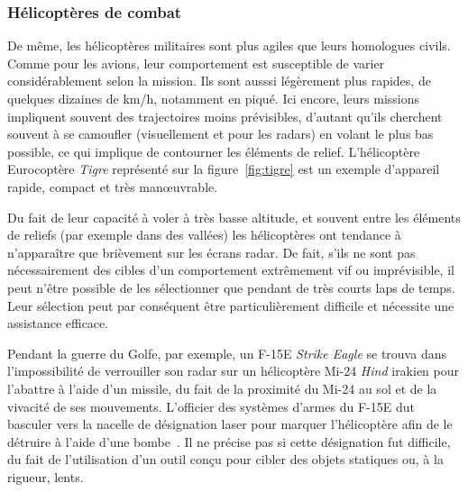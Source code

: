 	
	\subsubsection{Hélicoptères de combat}
	De même, les hélicoptères militaires sont plus agiles que leurs homologues civils. Comme pour les avions, leur comportement est susceptible de varier considérablement selon la mission. Ils sont ausssi légèrement plus rapides, de quelques dizaines de km/h, notamment en piqué. Ici encore, leurs missions impliquent souvent des trajectoires moins prévisibles, d'autant qu'ils cherchent souvent à se camoufler (visuellement et pour les radars) en volant le plus bas possible, ce qui implique de contourner les éléments de relief. L'hélicoptère Eurocoptère \emph{Tigre} représenté sur la figure~\ref{fig:tigre} est un exemple d'appareil rapide, compact et très manœuvrable.
	
	Du fait de leur capacité à voler à très basse altitude, et souvent entre les éléments de reliefs (par exemple dans des vallées) les hélicoptères ont tendance à n'apparaître que brièvement sur les écrans radar. De fait, s'ils ne sont pas nécessairement des cibles d'un comportement extrêmement vif ou imprévisible, il peut n'être possible de les sélectionner que pendant de très courts laps de temps. Leur sélection peut par conséquent être particulièrement difficile et nécessite une assistance efficace.
	
	Pendant la guerre du Golfe, par exemple, un F-15E \emph{Strike Eagle} se trouva dans l'impossibilité de verrouiller son radar sur un hélicoptère Mi-24 \emph{Hind} irakien pour l'abattre à l'aide d'un missile, du fait de la proximité du Mi-24 au sol et de la vivacité de ses mouvements. L'officier des systèmes d'armes du F-15E dut basculer vers la nacelle de désignation laser pour \og marquer \fg{} l'hélicoptère afin de le détruire à l'aide d'une bombe~\cite{craig2007debrief}. Il ne précise pas si cette désignation fut difficile, du fait de l'utilisation d'un outil conçu pour cibler des objets statiques ou, à la rigueur, lents.
	
	
